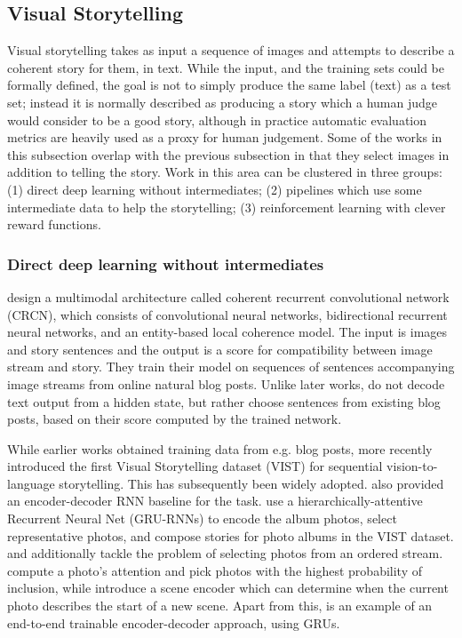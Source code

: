 \documentclass[a4paper,fleqn]{cas-sc}
\begin{document}
\subsection{Visual Storytelling } Visual storytelling takes as input a sequence of images and attempts to describe a coherent story for them, in text. While the input, and the training sets could be formally defined, the goal is not to simply produce the same label (text) as a test set; instead it is normally described as producing a story which a human judge would consider to be a good story, although in practice automatic evaluation metrics are heavily used as a proxy for human judgement.
Some of the works in this subsection overlap with the previous subsection in that they select images in addition to telling the story. Work in this area can be clustered in three groups: (1) direct deep learning without intermediates; (2) pipelines which use some intermediate data to help the storytelling; (3) reinforcement learning with clever reward functions.

\subsubsection{ Direct deep learning without intermediates}\label{without}
\citet{ImageStream2015} design a multimodal architecture called coherent recurrent convolutional network (CRCN), which consists of convolutional neural networks, bidirectional recurrent neural networks, and an entity-based local coherence model. 
The input is images and story sentences and the output is a score for compatibility  between image stream and story.
They train their model on sequences of sentences accompanying image streams from online natural blog posts. Unlike later works, \citet{ImageStream2015} do not decode text output from a hidden state, but rather choose sentences from existing blog posts, based on their score computed by the trained network.

While earlier works obtained training data from e.g. blog posts, more recently \cite{Huang2016} introduced the first Visual Storytelling dataset (VIST)  for sequential vision-to-language storytelling. This has subsequently been widely adopted.
\cite{Huang2016} also provided an encoder-decoder RNN baseline for the task.
\cite{Yulicheng2017} use a hierarchically-attentive Recurrent Neural Net (GRU-RNNs) to encode the album photos, select representative photos, and compose stories for photo albums in the VIST dataset.  
\cite{Yulicheng2017} and \citet{wang2019} additionally tackle the problem of selecting photos from an ordered stream. \cite{Yulicheng2017} compute a photo's attention and pick photos with the highest probability of inclusion, while \citet{wang2019}  introduce a scene encoder which can determine when the current photo describes the start of a new scene. Apart from this, \citet{wang2019} is an example of an end-to-end trainable encoder-decoder approach, using GRUs.
\end{document}
